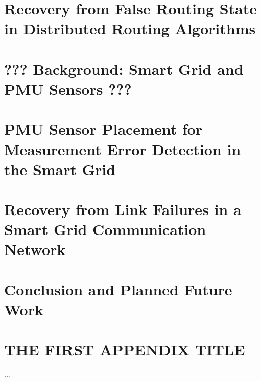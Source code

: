 \documentclass{umthesis}          %
\begin{document}



\chapter{Recovery from False Routing State in Distributed Routing Algorithms}
\label{ch:rollback}



















\chapter{??? Background: Smart Grid and PMU Sensors ???}



\chapter{PMU Sensor Placement for Measurement Error Detection in the Smart Grid}
\label{ch:pmu-placement}








 








\chapter{Recovery from Link Failures in a Smart Grid Communication Network}
\label{ch:reliable-mcast}

\chapter{Conclusion and Planned Future Work}
\label{ch:conclusion}




\appendix
\chapter{THE FIRST APPENDIX TITLE}
...

\backmatter  %




\end{document}
